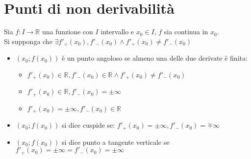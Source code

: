 \chapter{Punti di non derivabilit\`a}
Sia $f:I\rightarrow\mathbb{R}$ una funzione con $I$ intervallo e $x_0\in I$, $f$ sia continua in $x_0$. \\
Si supponga che $\exists f'_+(x_0),f'_-(x_0)\wedge f'_+(x_0)\neq f'_-(x_0)$
\begin{itemize}
\item $(x_0;f(x_0))$ \`e un punto angoloso se almeno una delle due derivate \`e finita:
\begin{itemize}
\item $f'_+(x_0)\in\mathbb{R},f'_-(x_0)\in\mathbb{R}\wedge f'_+(x_0)\neq f'_-(x_0)$
\item $f'_+(x_0)\in\mathbb{R}, f'_-(x_0)=\pm\infty$
\item $f'_+(x_0)=\pm\infty, f'_-(x_0)\in\mathbb{R}$
\end{itemize}
\item $(x_0;f(x_0))$ si dice cuspide se: $f'_+(x_0)=\pm\infty, f'_-(x_0)=\mp\infty$ 
\item $(x_0;f(x_0))$ si dice punto a tangente verticale se $f'_+(x_0)=\pm\infty=f'_-(x_0)=\pm\infty$
\end{itemize}